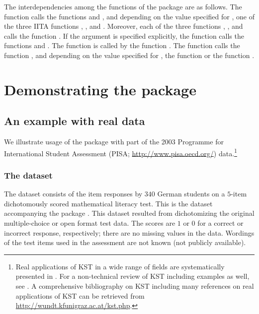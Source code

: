 \documentclass[nojss]{jss}
\begin{document}
The interdependencies among the functions of the package are as follows. 
The function  calls the functions  and ,
and depending on the value specified for , one of the three IITA functions 
, , and . Moreover, each of the 
three functions , , and  calls the function . If the argument  is specified explicitly, the function  calls the functions  and . The function
 is called by the function . The function 
calls the function , and depending on the value specified for , 
the function  or the function .

\section[Demonstrating the package DAKS]{Demonstrating the package }
\label{Demo}

\subsection{An example with real data}
\label{subsec:pisa_appl}

We illustrate usage of the package  with part of the 2003 Programme for International Student Assessment (PISA; \url{http://www.pisa.oecd.org/}) data.\footnote{Real applications 
of KST in a wide range of fields are systematically presented in \cite{AL:99}. For a non-technical
review of KST including examples as well, see \cite{FKVDJ:90}. A comprehensive bibliography on 
KST including many references on real applications of KST can be retrieved from 
\url{http://wundt.kfunigraz.ac.at/kst.php}.}

\subsubsection{The dataset}

The dataset consists of the item responses by $340$ German students on a $5$-item dichotomously scored mathematical literacy test. This is the  dataset accompanying the package .
This dataset resulted from dichotomizing the original multiple-choice or open format test data. The scores are $1$ or $0$ for a correct or incorrect 
response, respectively; there are no missing values in the data.
Wordings of the test items used in the assessment are not known (not publicly available). 
\end{document}
